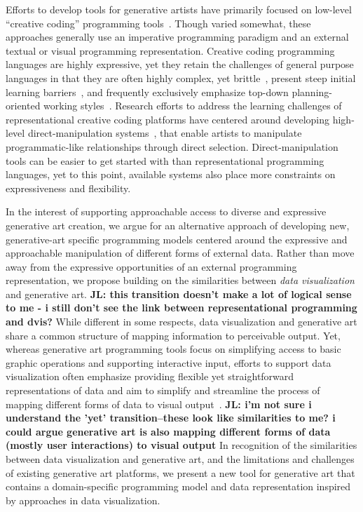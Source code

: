 \documentclass{sigchi}
\newcommand {\jingyi}[1]{{\color{purple}\bf{JL: #1}\normalfont}}
\begin{document}
Efforts to develop tools for generative artists have primarily focused on low-level ``creative coding'' programming tools~\cite{grasshopper,processing,openframeworks}. Though varied somewhat, these approaches generally use an imperative programming paradigm and an external textual or visual programming representation. Creative coding programming languages are highly expressive, yet they retain the challenges of general purpose languages in that they are often highly complex, yet brittle~\cite{mccullough}, present steep initial learning barriers~\cite{Jacobs:2017:SEP:3025453.3025927}, and frequently exclusively emphasize top-down planning-oriented working styles~\cite{Schachman:2012:API:2384592.2384594}. Research efforts to address the learning challenges of representational creative coding platforms have centered around developing high-level direct-manipulation systems~\cite{Schachman:2012:API:2384592.2384594,Jacobs:2017:SEP:3025453.3025927,Hoarau,kitty}, that enable artists to manipulate programmatic-like relationships through direct selection. Direct-manipulation tools can be easier to get started with than representational programming languages, yet to this point, available systems also place more constraints on expressiveness and flexibility.

In the interest of supporting approachable access to diverse and expressive generative art creation, we argue for an alternative approach of developing new, generative-art specific programming models centered around the expressive and approachable manipulation of different forms of external data. Rather than move away from the expressive opportunities of an external programming representation, we propose building on  the similarities between \textit{data visualization} and generative art. \jingyi{this transition doesn't make a lot of logical sense to me - i still don't see the link between representational programming and dvis?} While different in some respects, data visualization and generative art share a common structure of mapping information to perceivable output. Yet, whereas generative art programming tools focus on simplifying access to basic graphic operations and supporting interactive input, efforts to support data visualization often emphasize providing flexible yet straightforward representations of data and aim to simplify and streamline the process of mapping different forms of data to visual output~\cite{Heer:2010:DLD:1907651.1908001}. \jingyi{i'm not sure i understand the 'yet' transition--these look like similarities to me? i could argue generative art is also mapping different forms of data (mostly user interactions) to visual output} In recognition of the similarities between data visualization and generative art, and the limitations and challenges of existing generative art platforms, we present a new tool for generative art that contains a domain-specific programming model and data representation inspired by approaches in data visualization. 
\end{document}
